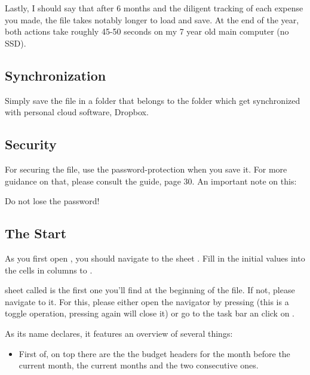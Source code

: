Lastly, I should say that after 6 months and the diligent tracking of each expense you made, the file takes notably longer to load and save.
At the end of the year, both actions take roughly 45-50 seconds on my 7 year old main computer (no SSD).

\subsection{Synchronization}
\label{subsec:synchronization}

Simply save the file in a folder that belongs to the folder which get synchronized with personal cloud software, \eg Dropbox.

\subsection{Security}
\label{subsec:security}

For securing the file, use the password-protection when you save it.
For more guidance on that, please consult the  guide, page 30.
An important note on this:
\begin{specialnote}
Do not lose the password!
\end{specialnote}

\subsection{The Start}
\label{subsec:opening-the-file}

As you first open \tfn, you should navigate to the sheet .
Fill in the initial values into the cells in columns  to .

sheet called  is the first one you'll find at the beginning of the file.
If not, please navigate to it.
For this, please either open the navigator by pressing  (this is a toggle operation, pressing  again will close it) or go to the task bar an click on  \structurenext {}.

As its name declares, it features an overview of several things:
\begin{itemize}
	\item First of, on top there are the the budget headers for the month before the current month, the current months and the two consecutive ones.
\end{itemize}

